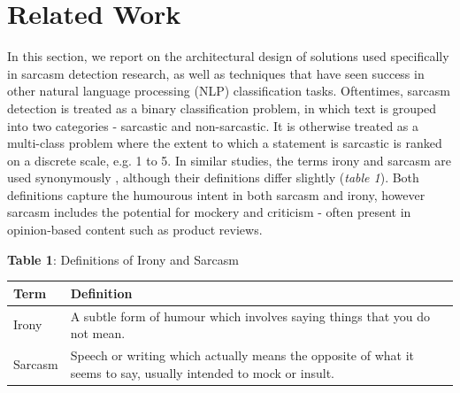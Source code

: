 \documentclass[12pt,a4paper]{article}
\begin{document}
\section{Related Work}
\vspace{-4.2pt}
\noindent In this section, we report on the architectural design of solutions used specifically in sarcasm detection research, as well as techniques that have seen success in other natural language processing (NLP) classification tasks. Oftentimes, sarcasm detection is treated as a binary classification problem, in which text is grouped into two categories - sarcastic and non-sarcastic. It is otherwise treated as a multi-class problem where the extent to which a statement is sarcastic is ranked on a discrete scale, e.g. 1 to 5. In similar studies, the terms irony and sarcasm are used synonymously \cite{tsur2010icwsm}, although their definitions differ slightly (\textit{table 1}). Both definitions capture the humourous intent in both sarcasm and irony, however sarcasm includes the potential for mockery and criticism - often present in opinion-based content such as product reviews.\vspace{-2pt}

\begin{center}
	\textbf{Table 1}: Definitions of Irony and Sarcasm\vspace{-5pt}
\end{center}
\begin{center}
	\begin{tabular}{p{1.5cm}p{13.2cm}}
		\hline
		\textbf{Term} & \textbf{Definition}\\
		\hline\hline
		Irony & A subtle form of humour which involves saying things that you do not mean. \footnotemark[1]\\
		\hline
		Sarcasm & Speech or writing which actually means the opposite of what it seems to say, usually intended to mock or insult. \footnotemark[2]\\
		\hline
	\end{tabular}\\
\end{center}\vspace{-10pt}
\end{document}
